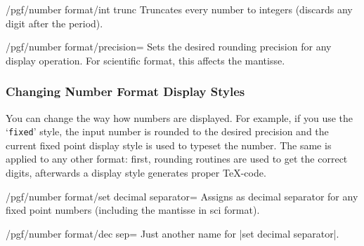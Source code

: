 \begin{key}{/pgf/number format/int trunc}
Truncates every number to integers (discards any digit after the period).

\begin{codeexample}[]
\hspace{1em}
\hspace{1em}
\hspace{1em}
\hspace{1em}
\end{codeexample}
\end{key}

\begin{key}{/pgf/number format/precision=}
Sets the desired rounding precision for any display operation. For scientific format, this affects the mantisse.
\end{key}

\subsubsection{Changing Number Format Display Styles}%
\label{sec:number:styles}%
You can change the way how numbers are displayed. For example, if you use the `\texttt{fixed}' style, the input number is rounded to the desired precision and the current fixed point display style is used to typeset the number. The same is applied to any other format: first, rounding routines are used to get the correct digits, afterwards a display style generates proper \TeX-code.

\begin{key}{/pgf/number format/set decimal separator=}
Assigns  as decimal separator for any fixed point numbers (including the mantisse in sci format).
\end{key}
\begin{key}{/pgf/number format/dec sep=}
	Just another name for |set decimal separator|.
\end{key}


